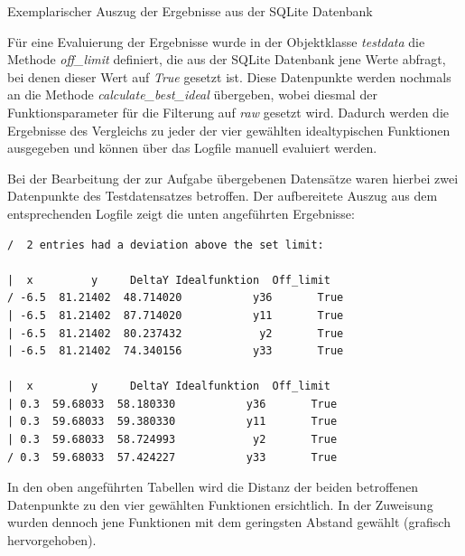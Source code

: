 \begin{table}[H]
\small
\centering
{}
\caption{Exemplarischer Auszug der Ergebnisse aus der SQLite Datenbank}
\label{tab:sqlitetest.csv}
\end{table} 

Für eine Evaluierung der Ergebnisse wurde in der Objektklasse \emph{testdata} die Methode \emph{off\_limit} definiert, die aus der SQLite Datenbank jene Werte abfragt, bei denen dieser Wert auf \emph{True} gesetzt ist. Diese Datenpunkte werden nochmals an die Methode \emph{calculate\_best\_ideal} übergeben, wobei diesmal der Funktionsparameter für die Filterung auf \emph{raw} gesetzt wird. Dadurch werden die Ergebnisse des Vergleichs zu jeder der vier gewählten idealtypischen Funktionen ausgegeben und können über das Logfile manuell evaluiert werden.

Bei der Bearbeitung der zur Aufgabe übergebenen Datensätze waren hierbei zwei Datenpunkte des Testdatensatzes betroffen. Der aufbereitete Auszug aus dem entsprechenden Logfile zeigt die unten angeführten Ergebnisse:

\begin{lstlisting}[caption={Datenpunkte mit überschrittenem Maximalabstand},
				   label=offlimit]
/  2 entries had a deviation above the set limit:

|  x         y     DeltaY Idealfunktion  Off_limit
/ -6.5  81.21402  48.714020           y36       True
| -6.5  81.21402  87.714020           y11       True
| -6.5  81.21402  80.237432            y2       True
| -6.5  81.21402  74.340156           y33       True

|  x         y     DeltaY Idealfunktion  Off_limit
| 0.3  59.68033  58.180330           y36       True
| 0.3  59.68033  59.380330           y11       True
| 0.3  59.68033  58.724993            y2       True
/ 0.3  59.68033  57.424227           y33       True
\end{lstlisting}

In den oben angeführten Tabellen wird die Distanz der beiden betroffenen Datenpunkte zu den vier gewählten Funktionen ersichtlich. In der Zuweisung wurden dennoch jene Funktionen mit dem geringsten Abstand gewählt (grafisch hervorgehoben).


